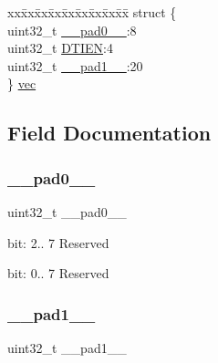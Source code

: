 \begin{DoxyCompactItemize}
\begin{tabbing}
\end{tabbing}\item 
\begin{tabbing}
xx\=xx\=xx\=xx\=xx\=xx\=xx\=xx\=xx\=\kill
struct \{\\
\>uint32\_t \mbox{\hyperlink{union_t_c_c___w_e_x_c_t_r_l___type_a3e57c2ef1c3ffb36722f000cc1156824}{\_\_pad0\_\_}}:8\\
\>uint32\_t \mbox{\hyperlink{union_t_c_c___w_e_x_c_t_r_l___type_a1a160736c52e9d4cbe40bc86ac5c8c86}{DTIEN}}:4\\
\>uint32\_t \mbox{\hyperlink{union_t_c_c___w_e_x_c_t_r_l___type_a6712ba6dd1d5b43d2d56ff8ac4e275a7}{\_\_pad1\_\_}}:20\\
\} \mbox{\hyperlink{union_t_c_c___w_e_x_c_t_r_l___type_ad2dc69495a5b6f981eeb1f24192a60c4}{vec}}\\

\end{tabbing}\end{DoxyCompactItemize}


\subsection{Field Documentation}
\mbox{\label{union_t_c_c___w_e_x_c_t_r_l___type_a3e57c2ef1c3ffb36722f000cc1156824}} 
\subsubsection{\texorpdfstring{\_\_pad0\_\_}{\_\_pad0\_\_}}
{\footnotesize\ttfamily uint32\+\_\+t \+\_\+\+\_\+pad0\+\_\+\+\_\+}

bit\+: 2.. 7 Reserved

bit\+: 0.. 7 Reserved \mbox{\label{union_t_c_c___w_e_x_c_t_r_l___type_a6712ba6dd1d5b43d2d56ff8ac4e275a7}} 
\subsubsection{\texorpdfstring{\_\_pad1\_\_}{\_\_pad1\_\_}}
{\footnotesize\ttfamily uint32\+\_\+t \+\_\+\+\_\+pad1\+\_\+\+\_\+}

